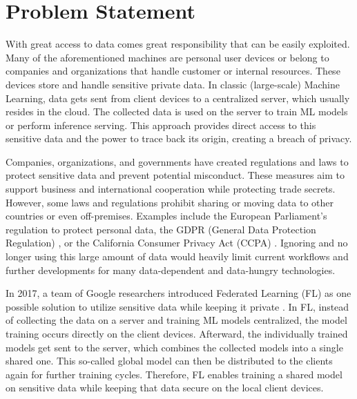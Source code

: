 \section{Problem Statement}\label{section:problem_statement}

With great access to data comes great responsibility that can be easily exploited.
Many of the aforementioned machines are personal user devices or belong to companies and organizations that handle customer or internal resources.
These devices store and handle sensitive private data.
In classic (large-scale) Machine Learning, data gets sent from client devices to a centralized server, which usually resides in the cloud.
The collected data is used on the server to train ML models or perform inference serving.
This approach provides direct access to this sensitive data and the power to trace back its origin, creating a breach of privacy.

Companies, organizations, and governments have created regulations and laws to protect sensitive data and prevent potential misconduct.
These measures aim to support business and international cooperation while protecting trade secrets.
However, some laws and regulations prohibit sharing or moving data to other countries or even off-premises.
Examples include the European Parliament's regulation to protect personal data, the GDPR (General Data Protection Regulation) \cite{eu_regulation}, or the California Consumer Privacy Act (CCPA) \cite{california_consumer_privacy_act}.
Ignoring and no longer using this large amount of data would heavily limit current workflows and further developments for many data-dependent and data-hungry technologies.

In 2017, a team of Google researchers introduced Federated Learning (FL) as one possible solution to utilize sensitive data while keeping it private \cite{paper:original_fl}.
In FL, instead of collecting the data on a server and training ML models centralized, the model training occurs directly on the client devices.
Afterward, the individually trained models get sent to the server, which combines the collected models into a single shared one.
This so-called global model can then be distributed to the clients again for further training cycles.
Therefore, FL enables training a shared model on sensitive data while keeping that data secure on the local client devices. 

